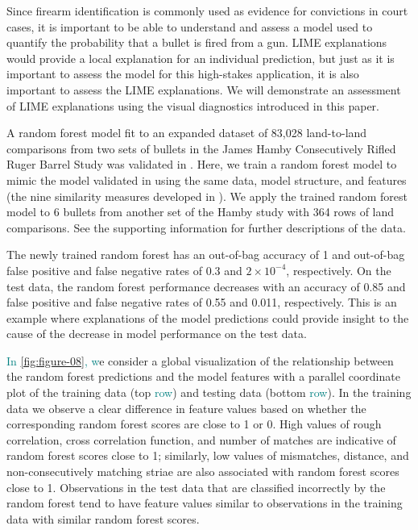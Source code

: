 \documentclass[AMS,STIX2COL]{WileyNJD-v2}\usepackage[]{graphicx}\usepackage[]{color}
\newcommand{\kge}[1]{\textcolor{teal}{#1}}
\renewcommand{\sout}[1]{\unskip}
\begin{document}
Since firearm identification is commonly used as evidence for convictions in court cases, it is important to be able to understand and assess a model used to quantify the probability that a bullet is fired from a gun. LIME explanations would provide a local explanation for an individual prediction, but just as it is important to assess the model for this high-stakes application, it is also important to assess the LIME explanations. We will demonstrate an assessment of LIME explanations using the visual diagnostics introduced in this paper.

A random forest model fit to an expanded dataset of 83,028 land-to-land comparisons from two sets of bullets in the James Hamby Consecutively Rifled Ruger Barrel Study \citep{hamby:2009} was validated in \citet{vanderplas:2020}. Here, we train a random forest model to mimic the model validated in \citet{vanderplas:2020} using the same data, model structure, and features (the nine similarity measures developed in \citet{hare:2017}). We apply the trained random forest model to 6 bullets from another set of the Hamby study with 364 rows of land comparisons. See the supporting information for further descriptions of the data. 

The newly trained random forest has an out-of-bag accuracy of 1 and out-of-bag false positive and false negative rates of 0.3 and \ensuremath{2\times 10^{-4}}, respectively. On the test data, the random forest performance decreases with an accuracy of 0.85 and false positive and false negative rates of 0.55 and 0.011, respectively. This is an example where explanations of the model predictions could provide insight to the cause of the decrease in model performance on the test data.

\kge{In \autoref{fig:figure-08}, } \sout{W}\kge{w}e consider a global visualization of the relationship between the random forest predictions and the model features with a parallel coordinate plot of the training data (top \kge{row}\sout{facet}) and testing data (bottom \kge{row}\sout{facets})\sout{ (\autoref{fig:figure-08})}. In the training data we observe a clear difference in feature values based on whether the corresponding random forest scores are close to 1 or 0. High values of rough correlation, cross correlation function, and number of matches are indicative of random forest scores close to 1; similarly, low values of mismatches, distance, and non-consecutively matching striae are also associated with random forest scores close to 1. Observations in the test data that are classified incorrectly by the random forest tend to have feature values similar to observations in the training data with similar random forest scores. \sout{For example, the observations in the test set known to be a match but have a random forest score below 0.5 have relatively low values of rough correlation, cross correlation function, and matches and relatively large values of mismatches, distance, and non-consecutively matching striae compared to observations with a random forest probability close to 1.}
\end{document}
